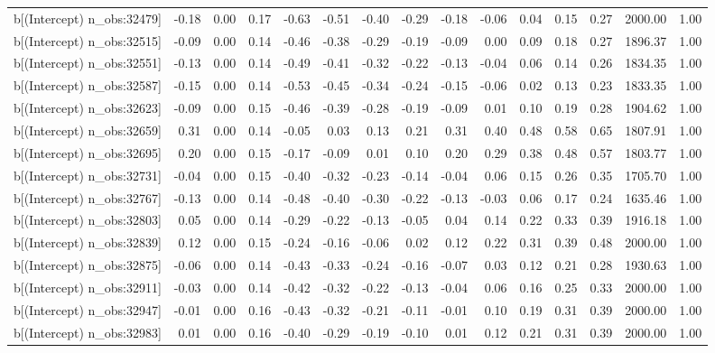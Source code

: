 \begin{table}[ht]
\begin{tabular}{rrrrrrrrrrrrrrr}
  b[(Intercept) n\_obs:32479] & -0.18 & 0.00 & 0.17 & -0.63 & -0.51 & -0.40 & -0.29 & -0.18 & -0.06 & 0.04 & 0.15 & 0.27 & 2000.00 & 1.00 \\ 
  b[(Intercept) n\_obs:32515] & -0.09 & 0.00 & 0.14 & -0.46 & -0.38 & -0.29 & -0.19 & -0.09 & 0.00 & 0.09 & 0.18 & 0.27 & 1896.37 & 1.00 \\ 
  b[(Intercept) n\_obs:32551] & -0.13 & 0.00 & 0.14 & -0.49 & -0.41 & -0.32 & -0.22 & -0.13 & -0.04 & 0.06 & 0.14 & 0.26 & 1834.35 & 1.00 \\ 
  b[(Intercept) n\_obs:32587] & -0.15 & 0.00 & 0.14 & -0.53 & -0.45 & -0.34 & -0.24 & -0.15 & -0.06 & 0.02 & 0.13 & 0.23 & 1833.35 & 1.00 \\ 
  b[(Intercept) n\_obs:32623] & -0.09 & 0.00 & 0.15 & -0.46 & -0.39 & -0.28 & -0.19 & -0.09 & 0.01 & 0.10 & 0.19 & 0.28 & 1904.62 & 1.00 \\ 
  b[(Intercept) n\_obs:32659] & 0.31 & 0.00 & 0.14 & -0.05 & 0.03 & 0.13 & 0.21 & 0.31 & 0.40 & 0.48 & 0.58 & 0.65 & 1807.91 & 1.00 \\ 
  b[(Intercept) n\_obs:32695] & 0.20 & 0.00 & 0.15 & -0.17 & -0.09 & 0.01 & 0.10 & 0.20 & 0.29 & 0.38 & 0.48 & 0.57 & 1803.77 & 1.00 \\ 
  b[(Intercept) n\_obs:32731] & -0.04 & 0.00 & 0.15 & -0.40 & -0.32 & -0.23 & -0.14 & -0.04 & 0.06 & 0.15 & 0.26 & 0.35 & 1705.70 & 1.00 \\ 
  b[(Intercept) n\_obs:32767] & -0.13 & 0.00 & 0.14 & -0.48 & -0.40 & -0.30 & -0.22 & -0.13 & -0.03 & 0.06 & 0.17 & 0.24 & 1635.46 & 1.00 \\ 
  b[(Intercept) n\_obs:32803] & 0.05 & 0.00 & 0.14 & -0.29 & -0.22 & -0.13 & -0.05 & 0.04 & 0.14 & 0.22 & 0.33 & 0.39 & 1916.18 & 1.00 \\ 
  b[(Intercept) n\_obs:32839] & 0.12 & 0.00 & 0.15 & -0.24 & -0.16 & -0.06 & 0.02 & 0.12 & 0.22 & 0.31 & 0.39 & 0.48 & 2000.00 & 1.00 \\ 
  b[(Intercept) n\_obs:32875] & -0.06 & 0.00 & 0.14 & -0.43 & -0.33 & -0.24 & -0.16 & -0.07 & 0.03 & 0.12 & 0.21 & 0.28 & 1930.63 & 1.00 \\ 
  b[(Intercept) n\_obs:32911] & -0.03 & 0.00 & 0.14 & -0.42 & -0.32 & -0.22 & -0.13 & -0.04 & 0.06 & 0.16 & 0.25 & 0.33 & 2000.00 & 1.00 \\ 
  b[(Intercept) n\_obs:32947] & -0.01 & 0.00 & 0.16 & -0.43 & -0.32 & -0.21 & -0.11 & -0.01 & 0.10 & 0.19 & 0.31 & 0.39 & 2000.00 & 1.00 \\ 
  b[(Intercept) n\_obs:32983] & 0.01 & 0.00 & 0.16 & -0.40 & -0.29 & -0.19 & -0.10 & 0.01 & 0.12 & 0.21 & 0.31 & 0.39 & 2000.00 & 1.00 \\ 

\end{tabular}
\end{table}
